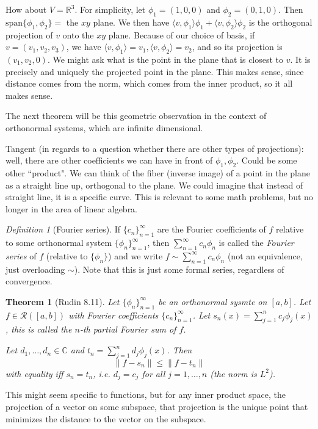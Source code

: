 \documentclass{article}
\theoremstyle{plain}
\newtheorem{theorem}{Theorem}
\theoremstyle{remark}
\newtheorem{definition}{Definition}
\newcommand{\R}{{\mathbb R}}
\newcommand{\C}{{\mathbb C}}
\begin{document}
How about $V = \R^3$.
For simplicity, let $\phi_1 = (1,0,0)$ and $\phi_2 = (0,1,0)$.
Then $\mathrm{span}\{\phi_1,\phi_2\} = $ the $xy$ plane.
We then have $\langle v, \phi_1 \rangle\phi_1 + \langle v, \phi_2 \rangle \phi_2$
is the orthogonal projection of $v$ onto the $xy$ plane.
Because of our choice of basis, if $v = (v_1,v_2,v_3)$, we have
$\langle v, \phi_1 \rangle = v_1, \langle v, \phi_2 \rangle = v_2$,
and so its projection is $(v_1,v_2,0)$.
We might ask what is the point in the plane that is closest to $v$.
It is precisely and uniquely the projected point in the plane.
This makes sense, since distance comes from the norm, which comes from the inner product,
so it all makes sense.

The next theorem will be this geometric observation in the context of
orthonormal systems, which are infinite dimensional.

Tangent (in regards to a question whether there are other types of projections):
well, there are other coefficients we can have in front of $\phi_1, \phi_2$.
Could be some other ``product".
We can think of the fiber (inverse image) of a point in the plane
as a straight line up, orthogonal to the plane.
We could imagine that instead of straight line, it is a specific curve.
This is relevant to some math problems, but no longer in the area of linear algebra.

\begin{definition}[Fourier series]
	If $\{c_n\}_{n=1}^\infty$ are the Fourier coefficients of $f$ relative
	to some orthonormal system $\{\phi_n\}_{n=1}^\infty$, then
	$\sum_{n=1}^\infty c_n \phi_n$ is called
	the \emph{Fourier series} of $f$ (relative to $\{\phi_n\}$)
	and we write $f \sim \sum_{n=1}^\infty c_n \phi_n$
	(not an equivalence, just overloading $\sim$).
	Note that this is just some formal series, regardless of convergence.
\end{definition}
\begin{theorem}[Rudin 8.11]
	Let $\{\phi_n\}_{n=1}^\infty$ be an orthonormal sysmte on $[a,b]$.
	Let $f \in \mathcal{R}([a,b])$ with Fourier coefficients $\{c_n\}_{n=1}^\infty$.
	Let $s_n(x) = \sum_{j=1}^n c_j \phi_j(x)$, this is called the
	$n$-th partial Fourier sum of $f$.
	
	Let $d_1,\dots,d_n \in \C$ and $t_n = \sum_{j=1}^n d_j \phi_j(x)$. Then
	\[
		\lVert f- s_n \rVert \leq \lVert f - t_n \rVert
	\]
	with equality iff $s_n = t_n$,
	i.e. $d_j = c_j$ for all $j = 1,\dots,n$
	(the norm is $L^2$).
\end{theorem}
This might seem specific to functions, but
for any inner product space, the projection of a vector on some subspace,
that projection is the unique point that minimizes the distance to the vector
on the subspace.
\end{document}
